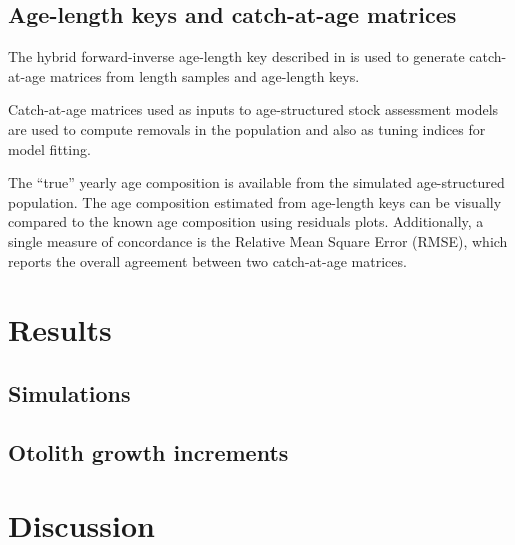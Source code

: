\documentclass[preprint, 3p,
authoryear]{elsarticle} %
\begin{document}
\hypertarget{age-length-keys-and-catch-at-age-matrices}{%
\subsection{Age-length keys and catch-at-age
matrices}\label{age-length-keys-and-catch-at-age-matrices}}

The hybrid forward-inverse age-length key described in
\citet{10.1093/icesjms/fsz072} is used to generate catch-at-age matrices
from length samples and age-length keys.

Catch-at-age matrices used as inputs to age-structured stock assessment
models are used to compute removals in the population and also as tuning
indices for model fitting.

The ``true'' yearly age composition is available from the simulated
age-structured population. The age composition estimated from age-length
keys can be visually compared to the known age composition using
residuals plots. Additionally, a single measure of concordance is the
Relative Mean Square Error (RMSE), which reports the overall agreement
between two catch-at-age matrices.

\hypertarget{results}{%
\section{Results}\label{results}}

\hypertarget{simulations}{%
\subsection{Simulations}\label{simulations}}

\hypertarget{otolith-growth-increments}{%
\subsection{Otolith growth increments}\label{otolith-growth-increments}}

\hypertarget{discussion}{%
\section{Discussion}\label{discussion}}

\renewcommand\refname{References}

\end{document}
